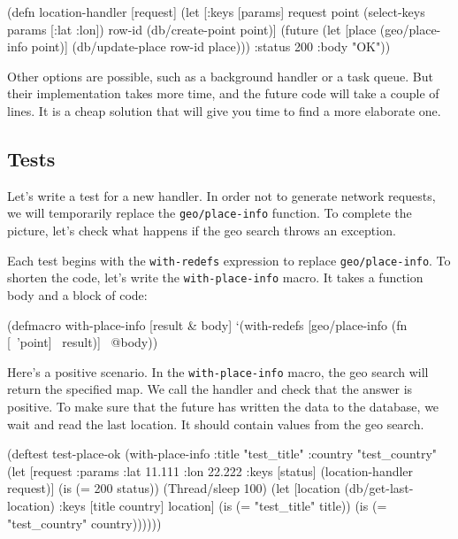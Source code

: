 \else

\begin{clojure}
(defn location-handler
  [request]
  (let [{:keys [params]} request
        point (select-keys params [:lat :lon])
        row-id (db/create-point point)]
    (future
      (let [place (geo/place-info point)]
        (db/update-place row-id place)))
    {:status 200 :body "OK"}))
\end{clojure}

\fi

Other options are possible, such as a background handler or a task queue.  But
their implementation takes more time, and the future code will take a couple of
lines. It is a cheap solution that will give you time to find a more elaborate
one.

\subsection{Tests}


Let's write a test for a new handler. In order not to generate network requests,
we will temporarily replace the \verb|geo/place-info| function. To complete the
picture, let's check what happens if the geo search throws an exception.

Each test begins with the \verb|with-redefs| expression to replace \verb|geo/place-info|.
To shorten the code, let's write the \verb|with-place-info| macro.
It takes a function body and a block of code:

\begin{clojure}
(defmacro with-place-info
  [result & body]
  `(with-redefs [geo/place-info
                 (fn [~'point] ~result)]
     ~@body))
\end{clojure}

Here's a positive scenario. In the \verb|with-place-info| macro, the geo search
will return the specified map. We call the handler and check that the answer is
positive. To make sure that the future has written the data to the database, we
wait and read the last location. It should contain values from the geo search.

\ifx\DEVICETYPE\MOBILE

\begin{clojure}
(deftest test-place-ok
  (with-place-info
    {:title "test_title"
     :country "test_country"}
    (let [request {:params
                   {:lat 11.111
                    :lon 22.222}}
          {:keys [status]}
          (location-handler request)]
      (is (= 200 status))
      (Thread/sleep 100)
      (let [location
            (db/get-last-location)
            {:keys [title country]}
            location]
        (is (= "test_title" title))
        (is (= "test_country"
               country))))))
\end{clojure}

